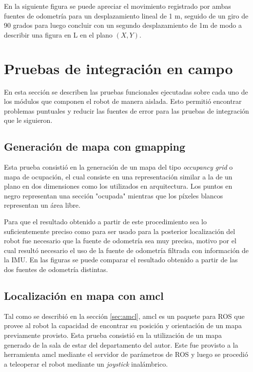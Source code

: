 En la siguiente figura se puede apreciar el movimiento registrado por ambas fuentes de odometría para un desplazamiento lineal de 1 m, seguido de un giro de 90 grados para luego concluir con un segundo desplazamiento de 1m de modo a describir una figura en L en el plano $(X,Y)$.

\section{Pruebas de integración en campo}

En esta sección se describen las pruebas funcionales ejecutadas sobre cada uno de los módulos que componen el robot de manera aislada. Esto permitió encontrar problemas puntuales y reducir las fuentes de error para las pruebas de integración que le siguieron.

\subsection{Generación de mapa con gmapping}

Esta prueba consistió en la generación de un mapa del tipo \textit{occupancy grid} o mapa de ocupación, el cual consiste en una representación similar a la de un plano en dos dimensiones como los utilizados en arquitectura. Los puntos en negro representan una sección "ocupada" mientras que los píxeles blancos representan un área libre.

Para que el resultado obtenido a partir de este procedimiento sea lo suficientemente preciso como para ser usado para la posterior localización del robot fue necesario que la fuente de odometría sea muy precisa, motivo por el cual resultó necesario el uso de la fuente de odometría filtrada con información de la IMU. En las figuras se puede comparar el resultado obtenido a partir de las dos fuentes de odometría distintas.


\subsection{Localización en mapa con amcl}

Tal como se describió en la sección \ref{sec:amcl}, amcl es un paquete para ROS que provee al robot la capacidad de encontrar su posición y orientación de un mapa previamente provisto. Esta prueba consistió en la utilización de un mapa generado de la sala de estar del departamento del autor. Este fue provisto a la herramienta amcl mediante el servidor de parámetros de ROS y luego se procedió a teleoperar el robot mediante un \textit{joystick} inalámbrico.

